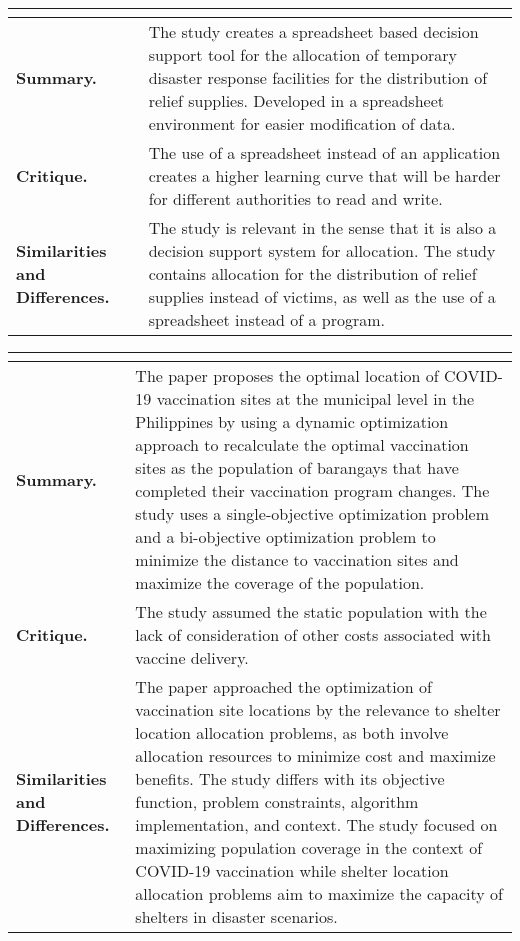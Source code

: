 \begin{longtable}{|L{.2\linewidth}|L{.74\linewidth}|}
	\hline
	\\ \hline
	\textbf{Summary.} & The study creates a spreadsheet based decision support tool for the allocation of temporary disaster response facilities for the distribution of relief supplies. Developed in a spreadsheet environment for easier modification of data.\\ \hline
	\textbf{Critique.} & The use of a spreadsheet instead of an application creates a higher learning curve that will be harder for different authorities to read and write.\\ \hline
	\textbf{Similarities and Differences.} & The study is relevant in the sense that it is also a decision support system for allocation. The study contains allocation for the distribution of relief supplies instead of victims, as well as the use of a spreadsheet instead of a program. \\ \hline
\end{longtable}

\begin{longtable}{|L{.2\linewidth}|L{.74\linewidth}|}
	\hline
	\\ \hline
	\textbf{Summary.} & The paper proposes the optimal location of COVID-19 vaccination sites at the municipal level in the Philippines by using a dynamic optimization approach to recalculate the optimal vaccination sites as the population of barangays that have completed their vaccination program changes. The study uses a single-objective optimization problem and a bi-objective optimization problem to minimize the distance to vaccination sites and maximize the coverage of the population.\\ \hline
	\textbf{Critique.} & The study assumed the static population with the lack of consideration of other costs associated with vaccine delivery.\\ \hline
	\textbf{Similarities and Differences.} & The paper approached the optimization of vaccination site locations by the relevance to shelter location allocation problems, as both involve allocation resources to minimize cost and maximize benefits. The study differs with its objective function, problem constraints, algorithm implementation, and context. The study focused on maximizing population coverage in the context of COVID-19 vaccination while shelter location allocation problems aim to maximize the capacity of shelters in disaster scenarios. \\ \hline
\end{longtable}

